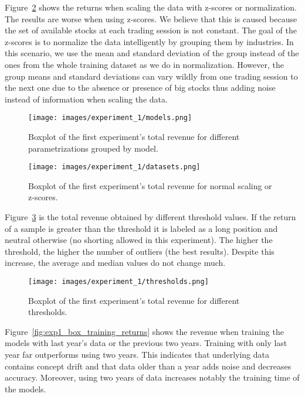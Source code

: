 Figure~\ref{fig:exp1_box_dataset_returns} shows the returns when scaling the data with z-scores or normalization. The results are worse when using z-scores. We believe that this is caused because the set of available stocks at each trading session is not constant. The goal of the z-scores is to normalize the data intelligently by grouping them by industries. In this scenario, we use the mean and standard deviation of the group instead of the ones from the whole training dataset as we do in normalization. However, the group means and standard deviations can vary wildly from one trading session to the next one due to the absence or presence of big stocks thus adding noise instead of information when scaling the data.

\begin{figure}
    \centering
    \texttt{[image: images/experiment\_1/models.png]}
    \caption{\small Boxplot  of the first experiment's total revenue for different parametrizations grouped by model.}
    \label{fig:exp1_box_model_returns}
\end{figure}

\begin{figure}
    \centering
    \texttt{[image: images/experiment\_1/datasets.png]}
    \caption{\small Boxplot  of the first experiment's total revenue for normal scaling or z-scores. %
    }
    \label{fig:exp1_box_dataset_returns}
\end{figure}


Figure~\ref{fig:exp1_box_thresh_returns} is the total revenue obtained by different threshold values. If the return of a sample is greater than the threshold it is labeled as a long position and neutral otherwise (no shorting allowed in this experiment). The higher the threshold, the higher the number of outliers (the best results). Despite this increase, the average and median values do not change much.

\begin{figure}
    \centering
    \texttt{[image: images/experiment\_1/thresholds.png]}
    \caption{\small Boxplot of the first experiment's total revenue for different thresholds.}
    \label{fig:exp1_box_thresh_returns}
 \end{figure}
 
Figure~\ref{fig:exp1_box_training_returns} shows the revenue when training the models with last year's data or the previous two years. Training with only last year far outperforms using two years. This indicates that underlying data contains concept drift and that data older than a year adds noise and decreases accuracy. Moreover, using two years of data increases notably the training time of the models.

